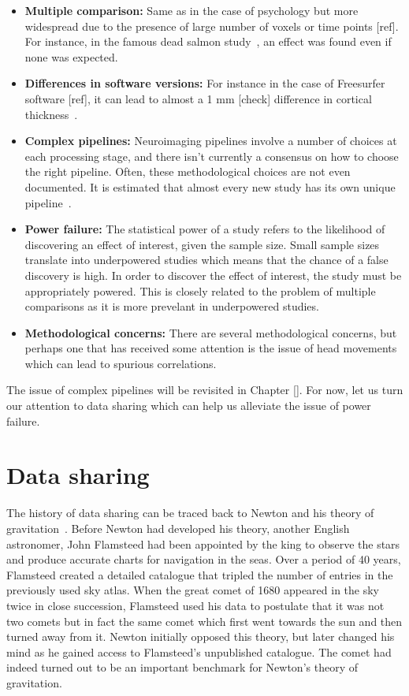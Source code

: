 \begin{itemize}[noitemsep,partopsep=0pt]
\item \textbf{Multiple comparison:} Same as in the case of psychology but more widespread due to the presence of large number of voxels or time points [ref]. For instance, in the famous dead salmon study~\citep{bennett2009neural}, an effect was found even if none was expected.
\item \textbf{Differences in software versions:} For instance in the case of Freesurfer software [ref], it can lead to almost a 1 mm [check] difference in cortical thickness~\citep{gronenschild2012effects}.
\item \textbf{Complex pipelines:} Neuroimaging pipelines involve a number of choices at each processing stage, and there isn't currently a consensus on how to choose the right pipeline. Often, these methodological choices are not even documented. It is estimated that almost every new study has its own unique pipeline~\citep{Carp2012289}.
\item \textbf{Power failure:} The statistical power of a study refers to the likelihood of discovering an effect of interest, given the sample size. Small sample sizes translate into underpowered studies which means that the chance of a false discovery is high. In order to discover the effect of interest, the study must be appropriately powered. This is closely related to the problem of multiple comparisons as it is more prevelant in underpowered studies.
\item \textbf{Methodological concerns:} There are several methodological concerns, but perhaps one that has received some attention is the issue of head movements~\citep{yendiki2014spurious} which can lead to spurious correlations.
\end{itemize}

The issue of complex pipelines will be revisited in Chapter []. For now, let us turn our attention to data sharing which can help us alleviate the issue of power failure.

\section{Data sharing}
The history of data sharing can be traced back to Newton and his theory of gravitation~\citep{pointofview2013}. Before Newton had developed his theory, another English astronomer, John Flamsteed had been appointed by the king to observe the stars and produce accurate charts for navigation in the seas. Over a period of 40 years, Flamsteed created a detailed catalogue that tripled the number of entries in the previously used sky atlas. When the great comet of 1680 appeared in the sky twice in close succession, Flamsteed used his data to postulate that it was not two comets but in fact the same comet which first went towards the sun and then turned away from it. Newton initially opposed this theory, but later changed his mind as he gained access to Flamsteed's unpublished catalogue. The comet had indeed turned out to be an important benchmark for Newton's theory of gravitation.


